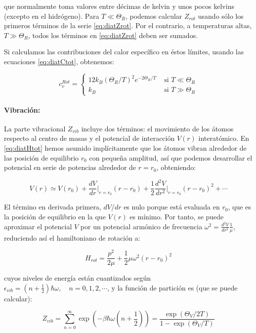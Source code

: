 \documentclass[11pt, a4paper]{article} %
\theoremstyle{named}
\begin{document}
que normalmente toma valores entre décimas de kelvin y unos pocos kelvins (excepto en el hidrógeno). Para $T\ll \Theta_R$, podemos calcular $Z_{rot}$ usando sólo los primeros términos de la serie \eqref{eq:diatZrot}. Por el contrario, a temperaturas altas, $T\gg \Theta_R$, todos los términos en \eqref{eq:diatZrot} deben ser sumados.

Si calculamos las contribuciones del calor específico en éstos límites, usando las ecuaciones \eqref{eq:diatCtot}, obtenemos:

\begin{equation}\label{eq:diatCrot}
    c_{v}^{Rot}=\left\{\begin{array}{ll}
    12 k_{B}\left(\Theta_{R} / T\right)^{2} e^{-2 \Theta_{R} / T} & \text { si } T \ll \Theta_{R} \\
    k_{B} & \text { si } T \gg \Theta_{R}
    \end{array}\right.
\end{equation}

\paragraph{Vibración:} La parte vibracional $Z_{vib}$ incluye dos términos: el movimiento de los átomos respecto al centro de masas y el potencial de interacción $V(r)$ interatómico. En \eqref{eq:diatHtot} hemos asumido implícitamente que los átomos vibran alrededor de las posición de equilibrio $r_0$ con pequeña amplitud, así que podemos desarrollar el potencial en serie de potencias alrededor de $r = r_0$, obteniendo:

$$
V(r) \simeq V\left(r_{0}\right)+\frac{d V}{d r}\bigg\rvert_{r=r_0}\left(r-r_{0}\right)+\frac{1}{2} \frac{d^{2} V}{d r^{2}}\bigg\rvert_{r=r_0}\left(r-r_{0}\right)^{2}+\cdots
$$

El término en derivada primera, $dV/dr$ es nulo porque está evaluada en $r_0$, que es la posición de equilibrio en la que $V(r)$ es mínimo. Por tanto, se puede aproximar el potencial $V$ por un potencial armónico de frecuencia $\omega^2= \frac{d^2 V}{dr^2}\frac{1}{\mu}$, reduciendo así el hamiltoniano de rotación a:

$$
H_{r o t}=\frac{p^{2}}{2 \mu}+\frac{1}{2} \mu \omega^{2}\left(r-r_{0}\right)^{2}
$$

cuyos niveles de energía están cuantizados según $\epsilon_{vib}=\left(n+\frac{1}{2}\right) \hbar \omega,\quad n=0,1,2, \cdots$, y la función de partición es (que se puede calcular):

\begin{equation}\label{eq:diatZvib}
    Z_{vib}=\sum_{n=0}^{\infty} \exp \left(-\beta \hbar \omega\left(n+\frac{1}{2}\right)\right)=\frac{\exp \left(\Theta_{V} / 2 T\right)}{1-\exp \left(\Theta_{V} / T\right)}
\end{equation}
\end{document}
